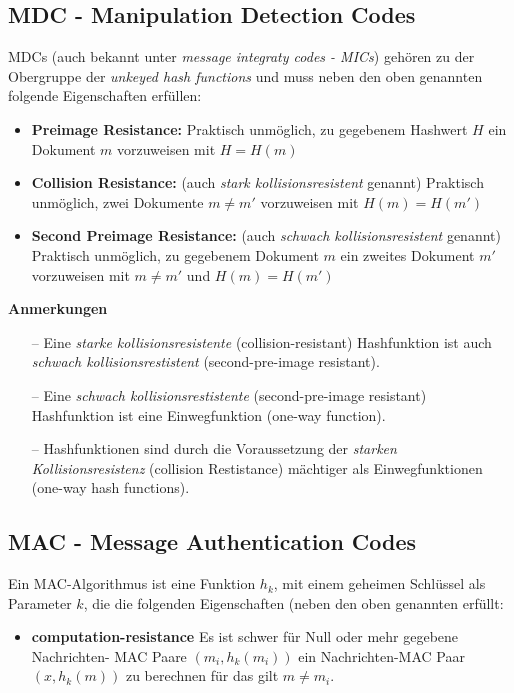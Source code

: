 \documentclass[8pt,a4paper,landscape]{article}
\begin{document}
\begin{multicols}{4}
\subsection{MDC - Manipulation Detection Codes} MDCs (auch bekannt unter \textit{message integraty codes - MICs}) gehören zu der Obergruppe der \textit{unkeyed hash functions} und muss neben den oben genannten folgende Eigenschaften erfüllen:
\begin{itemize}
\item \textbf{Preimage Resistance:} Praktisch unmöglich, zu gegebenem Hashwert $H$ ein Dokument $m$ vorzuweisen mit $H = H(m)$
\item \textbf{Collision Resistance:} (auch \textit{stark kollisionsresistent} genannt) 
Praktisch unmöglich, zwei Dokumente $m \neq m'$ vorzuweisen mit $H(m) = H(m')$ 
\item \textbf{Second Preimage Resistance:} (auch \textit{schwach kollisionsresistent} genannt) Praktisch unmöglich, zu gegebenem Dokument $m$ ein zweites Dokument $m'$ vorzuweisen mit $m \neq m'$ und $H(m) = H(m')$ 
\end{itemize}

\begin{center}\textbf{Anmerkungen}\end{center}

\begin{itemize}
 \item[--] Eine \textit{starke kollisionsresistente} (collision-resistant) Hashfunktion ist auch \textit{schwach kollisionsrestistent} (second-pre-image resistant).
 \item[--] Eine \textit{schwach kollisionsrestistente} (second-pre-image resistant) Hashfunktion ist eine Einwegfunktion (one-way function).
 \item[--] Hashfunktionen sind durch die Voraussetzung der \textit{starken Kollisionsresistenz} (collision Restistance) mächtiger als Einwegfunktionen (one-way hash functions).
 \end{itemize}
 


\subsection{MAC - Message Authentication Codes}
Ein MAC-Algorithmus ist eine Funktion $h_k$, mit einem geheimen Schlüssel als Parameter $k$, die die folgenden Eigenschaften (neben den oben genannten erfüllt: \begin{itemize}
 \item \textbf{computation-resistance} Es ist schwer für Null oder mehr gegebene Nachrichten- MAC Paare $(m_i, h_k(m_i))$ ein Nachrichten-MAC Paar $(x, h_k(m))$ zu berechnen für das gilt $m \neq m_i$.
 \end{itemize}


\end{multicols}
\end{document}
